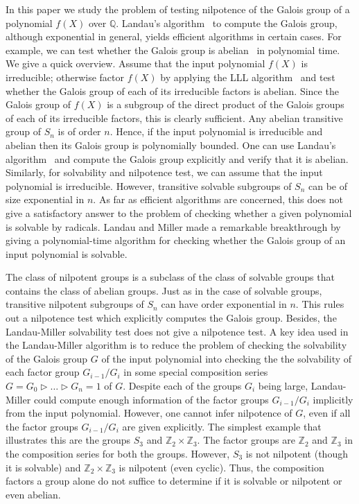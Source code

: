 \documentclass[prodmod,acmtalg]{acmsmall}
\newcommand{\Gal}[1]{{\ensuremath{\mathrm{Gal}\left(#1\right)}}}
\newcommand{\Q}{\ensuremath{\mathbb{Q}}}
\newcommand{\Z}{\ensuremath{\mathbb{Z}}}
\begin{document}
In this paper we study the problem of testing nilpotence of the Galois
group of a polynomial $f(X)$ over $\Q$. Landau's
algorithm~\cite{landau84galois} to compute the Galois group, although
exponential in general, yields efficient algorithms in certain
cases. For example, we can test whether the Galois group is
abelian~\cite{landau84galois} in polynomial time. We give a quick
overview. Assume that the input polynomial $f(X)$ is irreducible;
otherwise factor $f(X)$ by applying the LLL algorithm~\cite{lll} and
test whether the Galois group of each of its irreducible factors is
abelian. Since the Galois group of $f(X)$ is a subgroup of the direct
product of the Galois groups of each of its irreducible factors, this
is clearly sufficient. Any abelian transitive group of $S_n$ is of
order $n$. Hence, if the input polynomial is irreducible and abelian
then its Galois group is polynomially bounded. One can use Landau's
algorithm~\cite{landau84galois} and compute the Galois group
explicitly and verify that it is abelian. Similarly, for solvability
and nilpotence test, we can assume that the input polynomial is
irreducible. However, transitive solvable subgroups of $S_n$ can be of
size exponential in $n$. As far as efficient algorithms are concerned,
this does not give a satisfactory answer to the problem of checking
whether a given polynomial is solvable by radicals. Landau and Miller
made a remarkable breakthrough by giving a polynomial-time algorithm
for checking whether the Galois group of an input polynomial is
solvable\cite{landau85solvability}.


The class of nilpotent groups is a subclass of the class of solvable
groups that contains the class of abelian groups. Just as in the case
of solvable groups, transitive nilpotent subgroups of $S_n$ can have
order exponential in $n$. This rules out a nilpotence test which
explicitly computes the Galois group. Besides, the Landau-Miller
solvability test does not give a nilpotence test.  A key idea used in
the Landau-Miller algorithm is to reduce the problem of checking the
solvability of the Galois group $G$ of the input polynomial into
checking the the solvability of each factor group $G_{i-1}/G_i$ in
some special composition series $G = G_0 \rhd \ldots \rhd G_n = 1$ of
$G$. Despite each of the groups $G_i$ being large, Landau-Miller could
compute enough information of the factor groups $G_{i-1}/G_i$
implicitly from the input polynomial. However, one cannot infer
nilpotence of $G$, even if all the factor groups $G_{i-1}/G_i$ are
given explicitly. The simplest example that illustrates this are the
groups $S_3$ and $\Z_2\times \Z_3$. The factor groups are $\Z_2$ and
$\Z_3$ in the composition series for both the groups. However, $S_3$
is not nilpotent (though it is solvable) and $\Z_2\times \Z_3$ is
nilpotent (even cyclic). Thus, the composition factors a group alone
do not suffice to determine if it is solvable or nilpotent or even
abelian.
\end{document}
